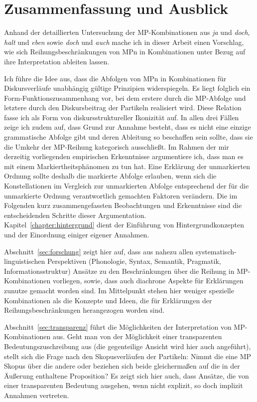 \chapter{Zusammenfassung und Ausblick}
\label{chapter:schluss}
Anhand der detaillierten Untersuchung der MP-Kom\-bi\-na\-ti\-on\-en aus \textit{ja} und \textit{doch}, \textit{halt} und \textit{eben} sowie \textit{doch} und \textit{auch} mache ich in dieser Arbeit einen Vorschlag, wie sich Reihungsbeschränkungen von MPn in Kombinationen unter Bezug auf ihre Interpretation ableiten lassen.

Ich führe die Idee aus, dass die Abfolgen von MPn in Kombinationen für Diskursverläufe unabhängig gültige Prinzipien widerspiegeln. Es liegt folglich ein Form-Funktionszusammenhang vor, bei dem erstere durch die MP-Abfolge und letztere durch den Diskursbeitrag der Partikeln realisiert wird. Diese Relation fasse ich als Form von diskursstruktureller Ikonizität  auf. In allen drei Fällen zeige ich zudem auf, dass Grund zur Annahme besteht, dass es nicht eine einzige grammatische Abfolge gibt und deren Ableitung so beschaffen sein sollte, dass sie die Umkehr der MP-Reihung kategorisch ausschließt. Im Rahmen der mir derzeitig vorliegenden empirischen Erkenntnisse argumentiere ich, dass man es mit einem Markiertheitsphänomen  zu tun hat. Eine Erklärung der unmarkierten Ordnung sollte deshalb die markierte Abfolge erlauben, wenn sich die Konstellationen im Vergleich zur unmarkierten Abfolge entsprechend der für die unmarkierte Ordnung verantwortlich gemachten Faktoren verändern. Die im Folgenden kurz zusammengefassten Beobachtungen und Erkenntnisse sind die entscheidenden Schritte dieser Argumentation.\\

\noindent
Kapitel~\ref{chapter:hintergrund} dient der Einführung von Hintergrundkonzepten und der Einordnung einiger eigener Annahmen. 

Abschnitt~\ref{sec:forschung} zeigt hier auf, dass aus nahezu allen systematisch-linguistischen Per\-spektiven (Phonologie, Syntax, Semantik, Pragmatik, Informationsstruktur) Ansätze zu den Beschränkungen über die Reihung in MP-Kom\-bi\-na\-ti\-on\-en vorliegen, sowie, dass auch diachrone  Aspekte für Erklärungen zunutze gemacht worden sind. Im Mittelpunkt stehen hier weniger spezielle Kombinationen als die Konzep\-te und Ideen, die für Erklärungen der Reihungsbeschränkungen herangezogen worden sind. 

Abschnitt~\ref{sec:transparenz} führt die Möglichkeiten der Interpretation von MP-Kombinatio\-nen aus. Geht man von der Möglichkeit einer transparenten Bedeutungszuschreibung aus (die gegenteilige Ansicht wird hier auch angeführt), stellt sich die Frage nach den Skopusverläufen  der Partikeln: Nimmt die eine MP Skopus über die andere oder beziehen sich beide gleichermaßen auf die in der Äußerung enthaltene Proposition? Es zeigt sich hier auch, dass Ansätze, die von einer transparenten Bedeutung ausgehen, wenn nicht explizit, so doch implizit Annahmen vertreten. 

